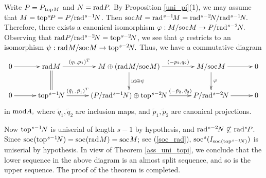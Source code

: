 \documentclass[10pt]{amsart}
\theoremstyle{definition}
\newcommand{\mmod}{{\rm mod}}
\newcommand{\rad}{{\rm rad}\hspace{.5pt}}
\newcommand{\soc}{{\rm soc}\hspace{.5pt}}
\newcommand{\ntop}{{\rm top}\hspace{.5pt}}
\begin{document}
\vspace{-1.5pt}

 Write $P=P_{\hspace{.8pt}\ntop M}$ and $N=\rad P.$ By Proposition \ref{uni_pi}(1), we may assume that $M=\ntop^s\hspace{-1.5pt}P=P/\rad^{s-1}\hspace{-1.5pt}N$. Then $\soc M=\rad^{s-1}\hspace{-1.5pt}M=\rad^{s-2}\hspace{-1.5pt}N/\rad^{s-1}\hspace{-1.5pt}N.$ Therefore, there exists a canonical isomorphism $\varphi: M/\soc M \to P/\rad^{s-2}\hspace{-1pt}N.$ Observing that $\rad P/\rad^{s-2}\hspace{-1.5pt}N=\ntop^{s-2} \hspace{-1.5pt} N$, we see that $\varphi$ restricts to an isomorphism $\psi: \rad M/\soc M\to \ntop^{s-2} \hspace{-1.5pt} N.$ Thus, we have a commutative diagram \vspace{-6pt}
$$\xymatrixcolsep{30pt}\xymatrix{ 0\ar[r] & \rad M \ar[r]^-{(q_1, p_1)^T} \ar@{=}[d] & M \oplus (\rad M/\soc M) \ar[r]^-{(-p_2, q_2)} \ar[d]^{{\rm id} \oplus \psi}& M/\soc M \ar[r] \ar[d]^\varphi & 0\\ 
0 \ar[r] & \ntop^{s-1}\hspace{-1.5pt}N \ar[r]^-{(\tilde{q}_1, \,\tilde{p}_1)^T}& (P/\rad^{s-1}\hspace{-1.2pt}N) \oplus 
\ntop^{s-2}\hspace{-1.5pt}N \ar[r]^-{(-\tilde{p}_2, \,\tilde{q}_2)} & P/\rad^{s-2}\hspace{-1.5pt}N \ar[r] & 0} \vspace{-5pt} $$ in $\mmod A,$ where $\tilde{q}_1, \tilde{q}_2$ are inclusion maps, and $\tilde{p}_1, \tilde{p}_2$ are canonical projections. 

Now $\ntop^{s-1}\hspace{-1pt}N$ is uniserial of length $s-1$ by hypothesis, and $\rad^{s-2}\hspace{-1pt}N \not\subseteq \rad^s\hspace{-1pt}P$. Since $\soc(\ntop^{s-1}\hspace{-1.5pt}N)=\soc(\rad M)=\soc M;$ see (\ref{soc_rad}), $\soc^s(I_{\soc(\ntop^{s-1}\hspace{-1.5pt}N)})$ is uniserial by hypothesis. In view of Theorem \ref{ass_uni_topi}, we conclude that the lower sequence in the above diagram is an almost split sequence, and so is the upper sequence. The proof of the theorem is completed. 
\end{document}
